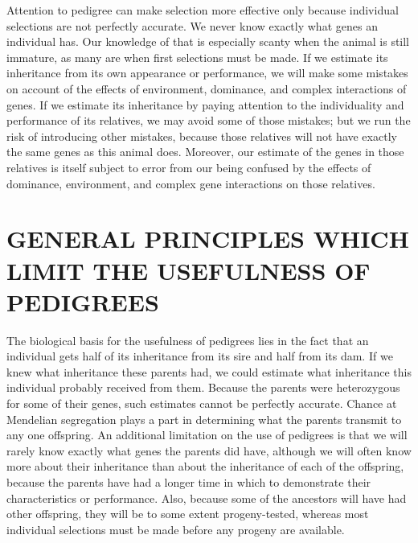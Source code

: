 Attention to pedigree can make selection more effective only
because individual selections are not perfectly accurate. We never know
exactly what genes an individual has. Our knowledge of that is especially
scanty when the animal is still immature, as many are when first
selections must be made. If we estimate its inheritance from its own
appearance or performance, we will make some mistakes on account of
the effects of environment, dominance, and complex interactions of
genes. If we estimate its inheritance by paying attention to the individuality
and performance of its relatives, we may avoid some of those
mistakes; but we run the risk of introducing other mistakes, because
those relatives will not have exactly the same genes as this animal does.
Moreover, our estimate of the genes in those relatives is itself subject to
error from our being confused by the effects of dominance, environment,
and complex gene interactions on those relatives.

\section*{GENERAL PRINCIPLES WHICH LIMIT THE USEFULNESS OF PEDIGREES}

The biological basis for the usefulness of pedigrees lies in the fact
that an individual gets half of its inheritance from its sire and half from
its dam. If we knew what inheritance these parents had, we could estimate
what inheritance this individual probably received from them.
Because the parents were heterozygous for some of their genes, such
estimates cannot be perfectly accurate. Chance at Mendelian segregation
plays a part in determining what the parents transmit to any one
offspring. An additional limitation on the use of pedigrees is that we
will rarely know exactly what genes the parents did have, although we
will often know more about their inheritance than about the inheritance
of each of the offspring, because the parents have had a longer
time in which to demonstrate their characteristics or performance. Also,
because some of the ancestors will have had other offspring, they will be
to some extent progeny-tested, whereas most individual selections must
be made before any progeny are available.

